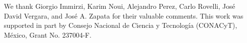 \documentclass[aps,prd,reprint,showpacs,longbibliography,superscriptaddress, groupedaddres,
titlepage,nofootinbib]{revtex4-1} %
\begin{document}
\acknowledgements


We thank Giorgio Immirzi, Karim Noui, Alejandro Perez, Carlo Rovelli, Jos\'e David Vergara, and Jos\'e A. Zapata for their valuable comments. This work was supported in part by Consejo Nacional de Ciencia y Tecnolog\'{i}a (CONACyT), M\'{e}xico, Grant No. 237004-F. 

 


\end{document}
